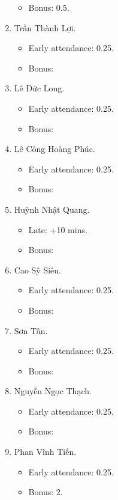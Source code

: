 \documentclass{article}
\begin{document}
\begin{enumerate}
	\begin{itemize}
		\item Bonus: 0.5.
	\end{itemize}
	\item {\sc Trần Thành Lợi.}
	\begin{itemize}
		\item Early attendance: 0.25.
		\item Bonus: 
	\end{itemize}
	\item {\sc Lê Đức Long.}
	\begin{itemize}
		\item Early attendance: 0.25.
		\item Bonus: 
	\end{itemize}
	\item {\sc Lê Công Hoàng Phúc.}
	\begin{itemize}
		\item Early attendance: 0.25.
		\item Bonus: 
	\end{itemize}
	\item {\sc Huỳnh Nhật Quang.}
	\begin{itemize}
		\item Late: +10 mins.
		\item Bonus: 
	\end{itemize}
	\item {\sc Cao Sỹ Siêu.}
	\begin{itemize}
		\item Early attendance: 0.25.
		\item Bonus: 
	\end{itemize}
	\item {\sc Sơn Tân.}
	\begin{itemize}
		\item Early attendance: 0.25.
		\item Bonus: 
	\end{itemize}
	\item {\sc Nguyễn Ngọc Thạch.}
	\begin{itemize}
		\item Early attendance: 0.25.
		\item Bonus: 
	\end{itemize}
	\item {\sc Phan Vĩnh Tiến.}
	\begin{itemize}
		\item Early attendance: 0.25.
		\item Bonus: 2.
	\end{itemize}
\end{enumerate}
\end{document}
